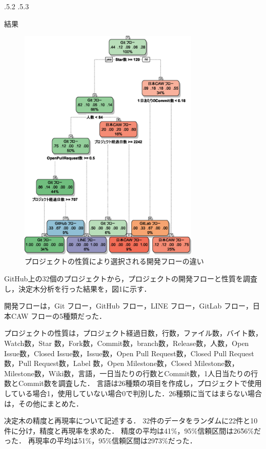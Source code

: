 \documentclass[uplatex,twocolumn]{jsarticle}
\makeatletter
\renewcommand{\section}{%
    \if@slide\clearpage\fi
    \@startsection{section}{1}{\z@}%
    {\Cvs \@plus.5\Cdp \@minus.2\Cdp}%
    {.5\Cvs \@plus.3\Cdp}%
    {\normalfont\raggedright}}
\makeatother
\begin{document}
\section{結果}

\begin{figure}[H]
\includegraphics[width=8.6cm,clip]{decisiontree.eps}
\caption{プロジェクトの性質により選択される開発フローの違い}\label{決定木}
\end{figure}


GitHub上の32個のプロジェクトから，プロジェクトの開発フローと性質を調査し，決定木分析を行った結果を，図1に示す．

開発フローは，Git フロー，GitHub フロー，LINE フロー，GitLab フロー，日本CAW フローの5種類だった．

プロジェクトの性質は，プロジェクト経過日数，行数，ファイル数，バイト数，Watch数，Star 数，Fork数，Commit数，branch数，Release数，人数，Open Issue数，Closed Issue数，Issue数，Open Pull Request数，Closed Pull Request数，Pull Request数，Label 数，Open Milestone数，Closed Milestone数，Milestone数，Wiki数，言語，一日当たりの行数とCommit数，1人日当たりの行数とCommit数を調査した．
言語は26種類の項目を作成し，プロジェクトで使用している場合1，使用していない場合0で判別した．26種類に当てはまらない場合は，その他にまとめた．


决定木の精度と再現率について記述する．
32件のデータをランダムに22件と10件に分け，精度と再現率を求めた．
精度の平均は41\%，95\%信頼区間は26\~56\%だった．
再現率の平均は51\%，95\%信頼区間は29\~73\%だった．
\end{document}
